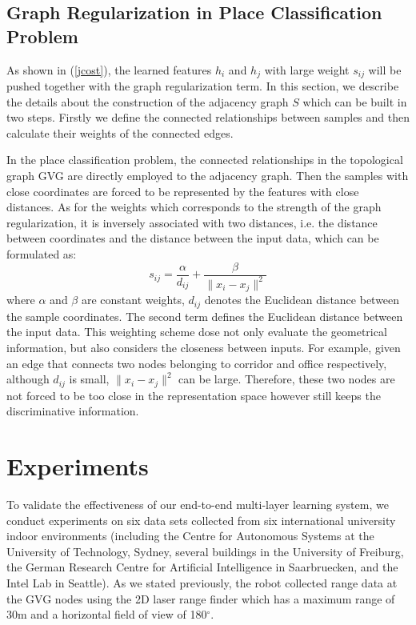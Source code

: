 \documentclass[letterpaper, 10 pt, conference]{ieeeconf}  %
\begin{document}
\subsection{Graph Regularization in Place Classification Problem}

As shown in (\ref{jcost}), the learned features $h_i$ and $h_j$ with large weight $s_{ij}$ will be pushed together with the graph regularization term. In this section, we describe the details about the construction of the adjacency graph $S$ which can be built in two steps. Firstly we define the connected relationships between samples and then calculate their weights of the connected edges.

In the place classification problem, the connected relationships in the topological graph GVG are directly employed to the adjacency graph. Then the samples with close coordinates are forced to be represented by the features with close distances. As for the weights which corresponds to the strength of the graph regularization, it is inversely associated with two distances, i.e. the distance between coordinates and the distance between the input data, which can be formulated as:
\begin{equation}\label{sij}
    s_{ij} =  \frac{\alpha}{d_{ij}} +  \frac{\beta}{\|x_i-x_j\|^2}
\end{equation}
where $\alpha$ and $\beta$ are constant weights, $d_{ij}$ denotes the Euclidean distance between the sample coordinates. The second term defines the Euclidean distance between the input data. This weighting scheme dose not only evaluate the geometrical information, but also considers the closeness between inputs. For example, given an edge that connects two nodes belonging to corridor and office respectively, although $d_{ij}$ is small, $\|x_i-x_j\|^2$ can be large. Therefore, these two nodes are not forced to be too close in the representation space however still keeps the discriminative information.







\section{Experiments} \label{secExp}

To validate the effectiveness of our end-to-end multi-layer learning system, we conduct experiments on six data sets collected from six international university indoor environments (including the Centre for Autonomous Systems at the University of Technology, Sydney, several buildings in the University of Freiburg, the German Research Centre for Artificial Intelligence in Saarbruecken, and the Intel Lab in Seattle). As we stated previously, the robot collected range data at the GVG nodes using the 2D laser range finder which has a maximum range of 30m and a horizontal field of view of 180$^\circ$.
\end{document}
